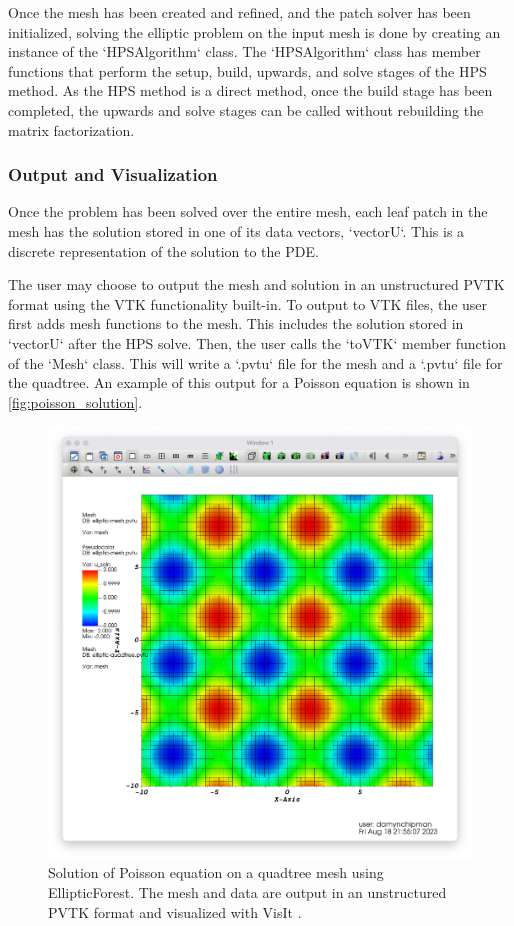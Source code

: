 Once the mesh has been created and refined, and the patch solver has been initialized, solving the elliptic problem on the input mesh is done by creating an instance of the `HPSAlgorithm` class. The `HPSAlgorithm` class has member functions that perform the setup, build, upwards, and solve stages of the HPS method. As the HPS method is a direct method, once the build stage has been completed, the upwards and solve stages can be called without rebuilding the matrix factorization.

\subsubsection{Output and Visualization}

Once the problem has been solved over the entire mesh, each leaf patch in the mesh has the solution stored in one of its data vectors, `vectorU`. This is a discrete representation of the solution to the PDE.

The user may choose to output the mesh and solution in an unstructured PVTK format using the VTK functionality built-in. To output to VTK files, the user first adds mesh functions to the mesh. This includes the solution stored in `vectorU` after the HPS solve. Then, the user calls the `toVTK` member function of the `Mesh` class. This will write a `.pvtu` file for the mesh and a `.pvtu` file for the quadtree. An example of this output for a Poisson equation is shown in \autoref{fig:poisson_solution}.

\begin{figure}
    \centering
    \includegraphics[width=\textwidth, clip=true, trim={0 0 0 0}]{figures/sine_cosine_output.png}
    \caption{Solution of Poisson equation on a quadtree mesh using EllipticForest. The mesh and data are output in an unstructured PVTK format and visualized with VisIt \citep{HPV_VisIt}.}
    \label{fig:poisson_solution}
\end{figure}

